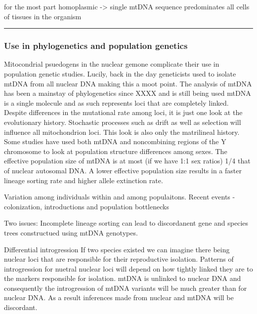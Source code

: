 \documentclass[11pt, oneside]{article}
\begin{document}
for the most part homoplasmic -> single mtDNA sequence predominates all cells of tissues in the 
organism



\hrule

\subsubsection{Use in phylogenetics and population genetics}

Mitocondrial psuedogens in the nuclear gemone complicate their use in population genetic studies. Lucily, 
back in the day geneticists used to isolate mtDNA from all nuclear DNA making this a moot point.  
The analysis of mtDNA has been a mainstay of phylogenetics since XXXX and is still being used 
mtDNA is a single molecule and as such represents loci that are completely linked. 
Despite differences in the mutational rate among loci, it is just one look 
at the evolutionary history. Stochastic processes such as drift as well as selection will influence all mitochondrion
loci. This look is also only the matrilineal history. Some studies have used both mtDNA
and noncombining regions of the Y chromosome to look at population structure differences among sexes. The effective
population size of mtDNA is at most (if we have 1:1 sex ratios) 1/4 that of nuclear autosomal DNA. A lower 
effective population size results in a faster lineage sorting rate and higher allele extinction rate. %

Variation among individuals within and among populaitons.
Recent events - colonization, introductions and population bottlenecks

Two issues:
Incomplete lineage sorting can lead to discordanent gene and species trees constructued using mtDNA genotypes. 

Differential introgression
If two species existed we can imagine there being nuclear loci that are responsible for their reproductive isolation.
Patterns of introgression for nuetral nuclear loci will depend on how tightly linked they are to the markers 
responsible for isolation. mtDNA is unlinked to nuclear DNA and consequently the introgression of mtDNA variants 
will be much greater than for nuclear DNA. %
As a result inferences made from nuclear and mtDNA will be discordant. 
\end{document}
